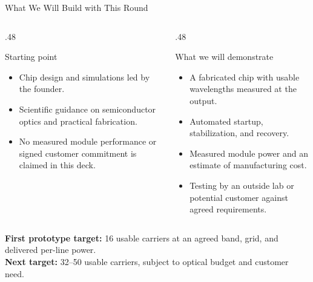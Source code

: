 \documentclass[aspectratio=169,10pt]{beamer}
\begin{document}
\begin{frame}{What We Will Build with This Round}
\begin{columns}[T]
\begin{column}{.48\textwidth}
\begin{block}{Starting point}
\begin{itemize}
\item Chip design and simulations led by the founder.
\item Scientific guidance on semiconductor optics and practical fabrication.
\item No measured module performance or signed customer commitment is claimed in this deck.
\end{itemize}
\end{block}
\end{column}
\begin{column}{.48\textwidth}
\begin{exampleblock}{What we will demonstrate}
\begin{itemize}
\item A fabricated chip with usable wavelengths measured at the output.
\item Automated startup, stabilization, and recovery.
\item Measured module power and an estimate of manufacturing cost.
\item Testing by an outside lab or potential customer against agreed requirements.
\end{itemize}
\end{exampleblock}
\end{column}
\end{columns}
\vspace{3mm}
\textbf{First prototype target:} 16 usable carriers at an agreed band, grid, and delivered per-line power.\\[2mm]
\textbf{Next target:} 32--50 usable carriers, subject to optical budget and customer need.
\end{frame}
\end{document}
